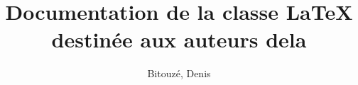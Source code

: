 \documentclass{gztarticle}
\begin{document}
\title{Documentation de la classe \LaTeX{} destinée aux auteurs de\newline la
  \gzt*{}}
%
\author[%
affiliation={%
  Université du Littoral Côte d'Opale, Laboratoire de mathématiques pures et
  appliquées%
},%
photo=Denis,%
email=denis.bitouze@lmpa.univ-littoral.fr,%
webpage=http://gte.univ-littoral.fr/members/dbitouze/pub/latex/,%
]{Bitouzé, Denis}
%
\maketitle*
%
\localtableofcontents
%




%
\printindex
%
\printbibliography
\end{document}
